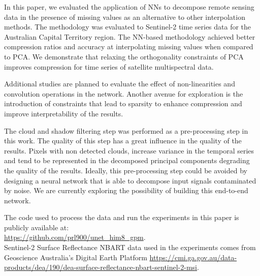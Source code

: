 \documentclass[essd, manuscript]{copernicus}
\begin{document}
\conclusions  %
In this paper, we evaluated the application of NNs to decompose remote sensing data in the presence of missing values as an alternative to other interpolation methods. The methodology was evaluated to Sentinel-2 time series data for the Australian Capital Territory region. The NN-based methodology achieved better compression ratios and accuracy at interpolating missing values when compared to PCA. We demonstrate that relaxing the orthogonality constraints of PCA improves compression for time series of satellite multispectral data.

Additional studies are planned to evaluate the effect of non-linearities and convolution operations in the network. Another avenue for exploration is the introduction of constraints that lead to sparsity to enhance compression and improve interpretability of the results. 

The cloud and shadow filtering step was performed as a pre-processing step in this work. The quality of this step has a great influence in the quality of the results. Pixels with non detected clouds, increase variance in the temporal series and tend to be represented in the decomposed principal components degrading the quality of the results. Ideally, this pre-processing step could be avoided by designing a neural network that is able to decompose input signals contaminated by noise. We are currently exploring the possibility of building this end-to-end network.






\codedataavailability{} 
The code used to process the data and run the experiments in this paper is publicly available at: \\
\href{https://github.com/prl900/unet_him8_gpm}{https://github.com/prl900/unet\_him8\_gpm}. \\
Sentinel-2 Surface Reflectance NBART data used in the experiments comes from Geoscience Australia's Digital Earth Platform \href{https://cmi.ga.gov.au/data-products/dea/190/dea-surface-reflectance-nbart-sentinel-2-msi}{https://cmi.ga.gov.au/data-products/dea/190/dea-surface-reflectance-nbart-sentinel-2-msi}. 
\end{document}
